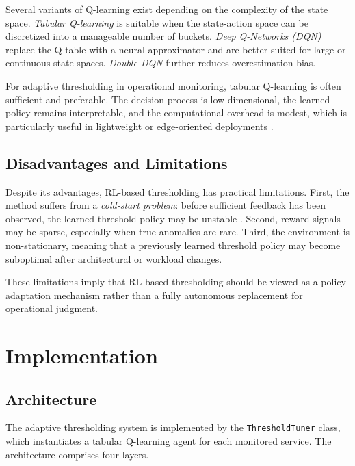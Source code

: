 Several variants of Q-learning exist depending on the complexity of the state 
space. \emph{Tabular Q-learning} is suitable when the state-action space can be 
discretized into a manageable number of buckets. \emph{Deep Q-Networks (DQN)} 
replace the Q-table with a neural approximator and are better suited for large 
or continuous state spaces. \emph{Double DQN} further reduces overestimation bias.

For adaptive thresholding in operational monitoring, tabular Q-learning is often 
sufficient and preferable. The decision process is low-dimensional, the learned 
policy remains interpretable, and the computational overhead is modest, which is 
particularly useful in lightweight or edge-oriented deployments \cite{turn0search1}.

\subsection{Disadvantages and Limitations}
\label{subsec:threshold_rl_disadvantages}

Despite its advantages, RL-based thresholding has practical limitations. First, 
the method suffers from a \emph{cold-start problem}: before sufficient feedback 
has been observed, the learned threshold policy may be unstable \cite{turn0search1}. 
Second, reward signals may be sparse, especially when true anomalies are rare. 
Third, the environment is non-stationary, meaning that a previously learned 
threshold policy may become suboptimal after architectural or workload changes.

These limitations imply that RL-based thresholding should be viewed as a policy 
adaptation mechanism rather than a fully autonomous replacement for operational 
judgment.

\section{Implementation}
\label{sec:threshold_implementation}

\subsection{Architecture}
\label{subsec:threshold_impl_architecture}

The adaptive thresholding system is implemented by the \texttt{ThresholdTuner}
class, which instantiates a tabular Q-learning agent for each monitored
service. The architecture comprises four layers.

